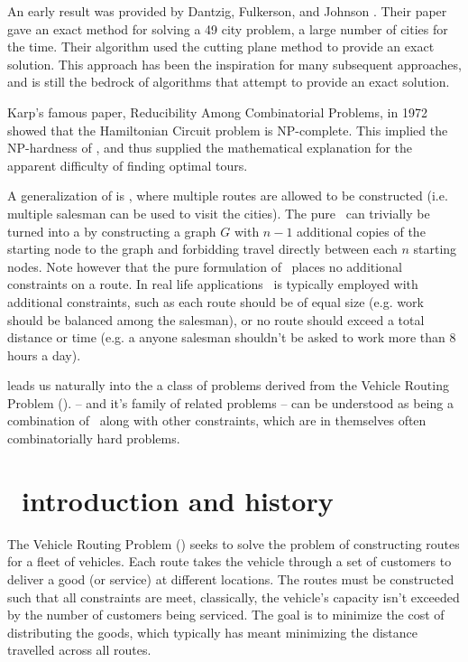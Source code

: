 An early result was provided by Dantzig, Fulkerson, and  Johnson \cite{Dantzig:1954}. Their paper gave an exact method for solving a 49 city problem, a large number of cities for the time. Their algorithm used the cutting plane method to provide an exact solution. This approach has been the inspiration for many subsequent approaches, and is still the bedrock of algorithms that attempt to provide an exact solution.  

Karp's famous paper, Reducibility Among Combinatorial Problems, in 1972 showed that the Hamiltonian Circuit problem is NP-complete. This implied the NP-hardness of \TSP, and thus supplied the mathematical explanation for the apparent difficulty of finding optimal tours.

A generalization of \TSP is \MTSP, where multiple routes are allowed to be constructed (i.e. multiple salesman can be used to visit the cities). The pure \MTSP\ can trivially be turned into a \TSP by constructing a graph $G$ with $n - 1$ additional copies of the starting node to the graph and forbidding travel directly between each $n$ starting nodes. Note however that the pure formulation of \MTSP\ places no additional constraints on a route. In real life applications \MTSP\ is typically employed with additional constraints, such as each route should be of equal size (e.g. work should be balanced among the salesman), or no route should exceed a total distance or time (e.g. a anyone salesman shouldn't be asked to work more than 8 hours a day). 

\MTSP leads us naturally into the a class of problems derived from the Vehicle Routing Problem (\VRP). \VRP -- and it's family of related problems -- can be understood as being a combination of \MTSP\ along with  other constraints, which are in themselves often combinatorially hard problems.    

\section{\VRP\ introduction and history}
The Vehicle Routing Problem (\VRP) seeks to solve the problem of constructing routes for a fleet of vehicles. Each route takes the vehicle through a set of customers to deliver a good (or service) at different locations. The routes must be constructed such that all constraints are meet, classically, the vehicle's capacity isn't exceeded by the number of customers being serviced. The goal is to minimize the cost of distributing the goods, which typically has meant minimizing the distance travelled across all routes.

